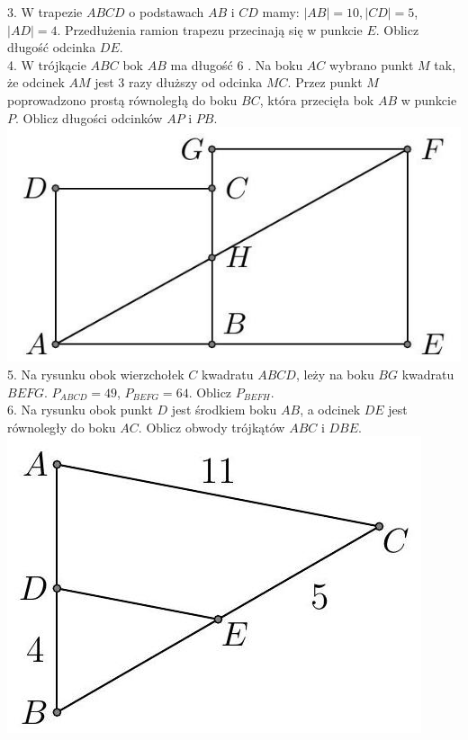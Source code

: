 \documentclass[10pt]{article}
\begin{document}
3. W trapezie \(A B C D\) o podstawach \(A B\) i \(C D\) mamy: \(|A B|=10,|C D|=5\), \(|A D|=4\). Przedłużenia ramion trapezu przecinają się w punkcie \(E\). Oblicz długość odcinka \(D E\).\\
4. W trójkącie \(A B C\) bok \(A B\) ma długość 6 . Na boku \(A C\) wybrano punkt \(M\) tak, że odcinek \(A M\) jest 3 razy dłuższy od odcinka \(M C\). Przez punkt \(M\) poprowadzono prostą równoległą do boku \(B C\), która przecięła bok \(A B\) w punkcie \(P\). Oblicz długości odcinków \(A P\) i \(P B\).\\
\includegraphics[max width=\textwidth, center]{2024_11_21_e9b4faa005d5be2cc318g-009(2)}\\
5. Na rysunku obok wierzchołek \(C\) kwadratu \(A B C D\), leży na boku \(B G\) kwadratu \(B E F G\). \(P_{A B C D}=49\), \(P_{B E F G}=64\). Oblicz \(P_{B E F H}\).\\
6. Na rysunku obok punkt \(D\) jest środkiem boku \(A B\), a odcinek \(D E\) jest równoległy do boku \(A C\). Oblicz obwody trójkątów \(A B C\) i \(D B E\).\\
\includegraphics[max width=\textwidth, center]{2024_11_21_e9b4faa005d5be2cc318g-009}\\
\end{document}
